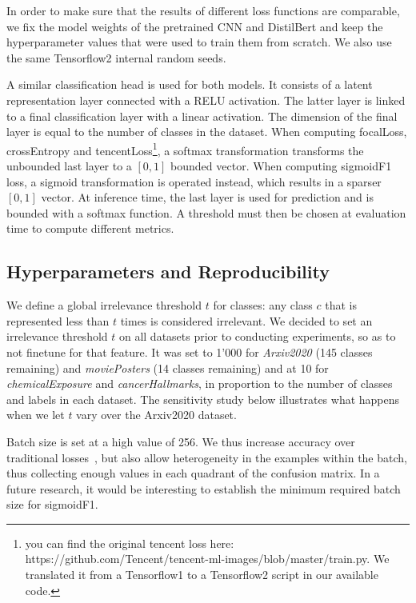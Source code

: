In order to make sure that the results of different loss functions are comparable, we fix the model weights of the pretrained CNN and DistilBert and keep the hyperparameter values that were used to train them from scratch. We also use the same Tensorflow2 internal random seeds.

A similar classification head is used for both models. It consists of a latent representation layer connected with a RELU activation. The latter layer is linked to a final classification layer with a linear activation. The dimension of the final layer is equal to the number of classes in the dataset. When computing focalLoss, crossEntropy and tencentLoss\footnote{you can find the original tencent loss here: https://github.com/Tencent/tencent-ml-images/blob/master/train.py. We translated it from a Tensorflow1 to a Tensorflow2 script in our available code.}, a softmax transformation transforms the unbounded last layer to a $[0,1]$ bounded vector. When computing sigmoidF1 loss, a sigmoid transformation is operated instead, which results in a sparser $[0,1]$ vector. At inference time, the last layer is used for prediction and is bounded with a softmax function. A threshold must then be chosen at evaluation time to compute different metrics.

\subsection{Hyperparameters and Reproducibility}

We define a global irrelevance threshold $t$ for classes: any class $c$ that is represented less than $t$ times is considered irrelevant. We decided to set an irrelevance threshold $t$ on all datasets prior to conducting experiments, so as to not finetune for that feature. It was set to 1'000 for \emph{Arxiv2020} (145 classes remaining) and \emph{moviePosters} (14 classes remaining) and at 10 for \emph{chemicalExposure} and \emph{cancerHallmarks}, in proportion to the number of classes and labels in each dataset. The sensitivity study below illustrates what happens when we let $t$ vary over the Arxiv2020 dataset.

Batch size is set at a high value of 256. We thus increase accuracy over traditional losses~\cite{bigBS}, but also allow heterogeneity in the examples within the batch, thus collecting enough values in  each quadrant of the confusion matrix. In a future research, it would be interesting to establish the minimum required batch size for sigmoidF1.

